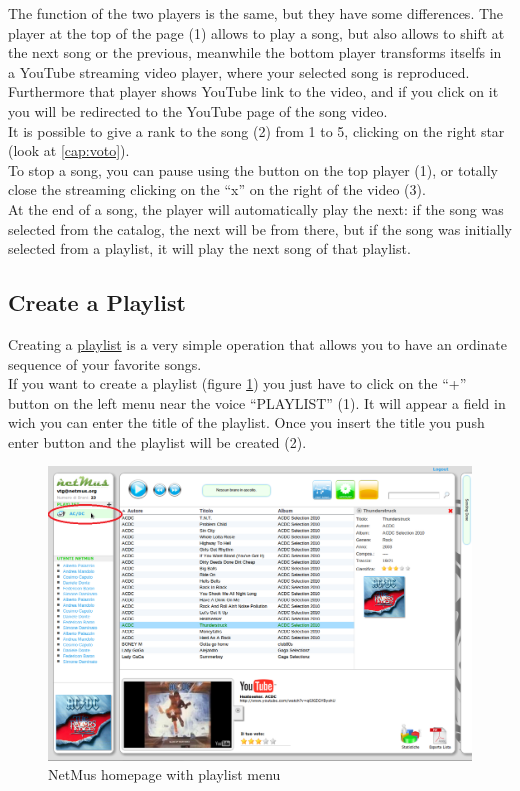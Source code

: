 The function of the two players is the same, but they have some differences.
The player at the top of the page (1) allows to play a song, but also
allows to shift at the next song or the previous, meanwhile the bottom player
transforms itselfs in a YouTube streaming video player, where your selected song
is reproduced. Furthermore that player shows YouTube link to the video, and if
you click on it you will be redirected to the YouTube page of the song video.\\
It is possible to give a rank to the song (2) from 1 to 5, clicking on the right
star (look at \ref{cap:voto}).\\

To stop a song, you can pause using the button on the top player (1), or totally
close the streaming clicking on the ``x'' on the right of the video
(3).\\

At the end of a song, the player will automatically play the next: if the song
was selected from the catalog, the next will be from there, but if the song was
initially selected from a playlist, it will play the next song of that
playlist.\\

\subsection{Create a Playlist}

Creating a \underline{playlist} is a very simple operation that allows you to
have an ordinate sequence of your favorite songs.\\
If you want to create a playlist (figure \ref{fig:playlist}) you just have to
click on the ``+'' button on the left menu near the voice ``PLAYLIST'' (1). It
will appear a field in wich you can enter the title of the playlist. Once you insert the title you push
enter button and the playlist will be created (2).\\

\begin{figure}[!htbp]
  \centering
  \includegraphics[width=15cm]{img/MU/new_playlist.png}
\caption{NetMus homepage with playlist menu}
\label{fig:playlist}
\end{figure}

